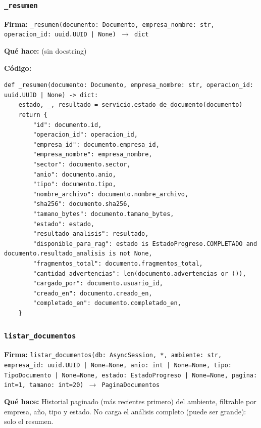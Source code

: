 \documentclass[11pt,a4paper]{article}
\begin{document}
\subsubsection*{\texttt{\_resumen}}
\textbf{Firma:} \texttt{\_resumen(documento: Documento, empresa\_nombre: str, operacion\_id: uuid.UUID | None) $\rightarrow$ dict}

\textbf{Qué hace:} (sin docstring)

\textbf{Código:}
\begin{lstlisting}
def _resumen(documento: Documento, empresa_nombre: str, operacion_id: uuid.UUID | None) -> dict:
    estado, _, resultado = servicio.estado_de_documento(documento)
    return {
        "id": documento.id,
        "operacion_id": operacion_id,
        "empresa_id": documento.empresa_id,
        "empresa_nombre": empresa_nombre,
        "sector": documento.sector,
        "anio": documento.anio,
        "tipo": documento.tipo,
        "nombre_archivo": documento.nombre_archivo,
        "sha256": documento.sha256,
        "tamano_bytes": documento.tamano_bytes,
        "estado": estado,
        "resultado_analisis": resultado,
        "disponible_para_rag": estado is EstadoProgreso.COMPLETADO and documento.resultado_analisis is not None,
        "fragmentos_total": documento.fragmentos_total,
        "cantidad_advertencias": len(documento.advertencias or ()),
        "cargado_por": documento.usuario_id,
        "creado_en": documento.creado_en,
        "completado_en": documento.completado_en,
    }
\end{lstlisting}

\subsubsection*{\texttt{listar\_documentos}}
\textbf{Firma:} \texttt{listar\_documentos(db: AsyncSession, *, ambiente: str, empresa\_id: uuid.UUID | None=None, anio: int | None=None, tipo: TipoDocumento | None=None, estado: EstadoProgreso | None=None, pagina: int=1, tamano: int=20) $\rightarrow$ PaginaDocumentos}

\textbf{Qué hace:} Historial paginado (más recientes primero) del ambiente, filtrable por empresa, año, tipo y estado. No carga
el análisis completo (puede ser grande): solo el resumen.
\end{document}
